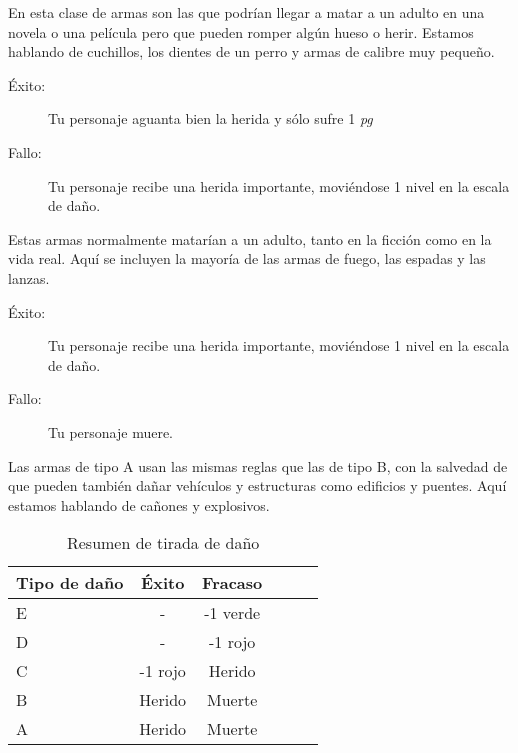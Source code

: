 
En esta clase de armas son las que podrían llegar a matar a un adulto en una novela
o una película pero que pueden romper algún hueso o herir. Estamos hablando de cuchillos, los dientes
de un perro y armas de calibre muy pequeño.

\begin{description}

\item[Éxito:] Tu personaje aguanta bien la herida y sólo sufre 1 \emph{pg}

\item[Fallo:] Tu personaje recibe una herida importante, moviéndose 1 nivel en la escala de daño.

\end{description}


Estas armas normalmente matarían a un adulto, tanto en la ficción como en la vida real. Aquí se incluyen
la mayoría de las armas de fuego, las espadas y las lanzas.

\begin{description}

\item[Éxito:] Tu personaje recibe una herida importante, moviéndose 1 nivel en la escala de daño.

\item[Fallo:] Tu personaje muere.

\end{description}


Las armas de tipo A usan las mismas reglas que las de tipo B, con la salvedad de que pueden también dañar
vehículos y estructuras como edificios y puentes. Aquí estamos hablando de cañones y explosivos.


\begin{table}[ht]
\centering
\begin{tabular}{lccccl}
\toprule
Tipo de daño  & Éxito & Fracaso \\\midrule\midrule
E             &  -    & -1 verde \\\midrule
D             &  -    & -1 rojo\\\midrule
C             & -1 rojo  & Herido  \\\midrule
B             & Herido & Muerte \\\midrule
A             & Herido & Muerte \\\midrule
\bottomrule
\end{tabular}
\caption{Resumen de tirada de daño}
\end{table}


